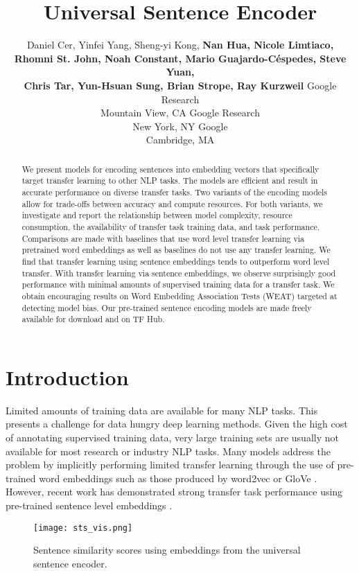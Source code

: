 \documentclass[11pt,a4paper]{article}
\title{Universal Sentence Encoder}
\author{Daniel Cer\textsuperscript{}, 
        Yinfei Yang\textsuperscript{}, 
        Sheng-yi Kong\textsuperscript{},
        \rm\textbf{Nan Hua\textsuperscript{}, 
        Nicole Limtiaco\textsuperscript{},} \\
        \rm\textbf{Rhomni St. John\textsuperscript{},
        Noah Constant\textsuperscript{},
        Mario Guajardo-C\'espedes\textsuperscript{},
        Steve Yuan\textsuperscript{},} \\
\rm\textbf{Chris Tar\textsuperscript{}, Yun{-}Hsuan Sung\textsuperscript{},
        Brian Strope\textsuperscript{},
        Ray Kurzweil\textsuperscript{}} \AND
  {\rm\textsuperscript{}Google Research}\\Mountain View, CA \And
  {\rm\textsuperscript{}Google Research}\\New York, NY
  \And
  {\rm\textsuperscript{}Google}\\Cambridge, MA
}
\date{}
\begin{document}
\maketitle
\begin{abstract}
We present models for encoding sentences into embedding vectors that specifically target transfer learning to other NLP tasks. The models are efficient and result in accurate performance on diverse transfer tasks. Two variants of the encoding models allow for trade-offs between accuracy and compute resources. For both variants, we investigate and report the relationship between model complexity, resource consumption, the availability of transfer task training data, and task performance. Comparisons are made with baselines that use word level transfer learning via pretrained word embeddings as well as baselines do not use any transfer learning. We find that transfer learning using sentence embeddings tends to outperform word level transfer. With transfer learning via sentence embeddings, we observe surprisingly good performance with minimal amounts of supervised training data for a transfer task. We obtain encouraging results on Word Embedding Association Tests (WEAT) targeted at detecting model bias. Our pre-trained sentence encoding models are made freely available for download and on TF Hub.

\end{abstract}

\section{Introduction}

Limited amounts of training data are available for many NLP tasks. This presents a challenge for data hungry deep learning methods. Given the high cost of annotating supervised training data, very large training sets are usually not available for most research or industry NLP tasks. Many models address the problem by implicitly performing limited transfer learning through the use of pre-trained word embeddings such as those produced by word2vec \cite{mikolov2013} or GloVe \cite{pennington2014glove}. However, recent work has demonstrated strong transfer task performance using pre-trained sentence level embeddings \cite{conneau2017}.


\begin{figure}
  \texttt{[image: sts\_vis.png]}
  \caption{Sentence similarity scores using embeddings from the universal sentence encoder.}
\label{fig:sts_vis}
\end{figure}
\end{document}
